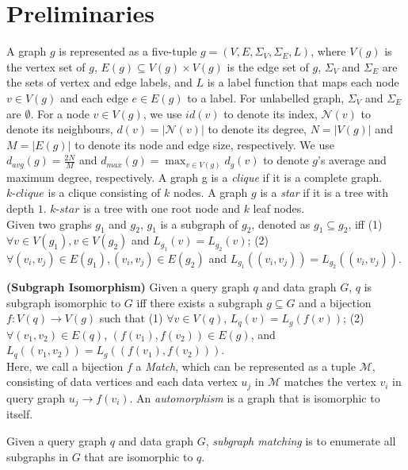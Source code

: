 \section{Preliminaries}
\label{sec:prelim}
A graph $g$ is represented as a five-tuple $g=(V, E, \Sigma_V,\Sigma_E, L)$, where $V(g)$ is the vertex set of $g$, $E(g) \subseteq V(g) \times V(g)$ is the edge set of $g$, $\Sigma_V$ and $\Sigma_E$ are the sets of vertex and edge labels, and $L$ is a label function that maps each node $v\in V(g)$ and each edge $e \in E(g)$ to a label. For unlabelled graph, $\Sigma_V$ and $\Sigma_E$ are $\emptyset$. For a node $v\in V(g)$, we use $id(v)$ to denote its index, $\mathcal{N}(v)$ to denote its neighbours, $d(v)=|\mathcal{N}(v)|$ to denote its degree, $N=|V(g)|$ and  $M=|E(g)|$ to denote its node and edge size, respectively. We use $d_{avg}(g) = \frac{2N}{M}$ and $d_{max}(g) = \max_{v\in V(g)}d_g(v)$ to denote $g$'s average and maximum degree, respectively. A graph g is a \textit{clique} if it is a complete graph. $k\text{-}clique$ is a clique consisting of $k$ nodes. A graph $g$ is a \textit{star} if it is a tree with depth $1$. $k\text{-}star$ is a tree with one root node and $k$ leaf nodes.\\

Given two graphs $g_1$ and $g_2$, $g_1$ is a subgraph of $g_2$, denoted as $g_1 \subseteq g_2$, iff (1) $\forall v\in V(g_1), v\in V(g_2)$ and $L_{g_1}(v)=L_{g_2}(v)$; (2) $\forall (v_i,v_j)\in E(g_1), (v_i,v_j)\in E(g_2)$ and $L_{g_1}((v_i,v_j))=L_{g_2}((v_i,v_j))$.\\

\begin{definition}
\label{def:isomorphism}{\textbf{(Subgraph Isomorphism)}} Given a query graph $q$ and data graph $G$, $q$ is subgraph isomorphic to $G$ iff there exists a subgraph $g\subseteq G$ and a bijection $f: V(q) \rightarrow V(g)$ such that (1) $\forall v \in V(q)$, $L_q(v) = L_{g}(f(v))$; (2) $\forall (v_1, v_2) \in E(q)$, $(f(v_1), f(v_2)) \in E(g)$, and $L_q((v_1, v_2)) = L_{g}((f(v_1), f(v_2)))$. \\

Here, we call a bijection $f$ a \textit{Match}, which can be represented as a tuple $\mathcal{M}$, consisting of data vertices and each data vertex $u_j$ in $\mathcal{M}$ matches the vertex $v_i$ in query graph $u_j \rightarrow f(v_i)$. An \textit{automorphism} is a graph that is isomorphic to itself.
\end{definition}

 Given a query graph $q$ and data graph $G$, \textit{subgraph matching} is to enumerate all subgraphs in $G$ that are isomorphic to $q$.\\

